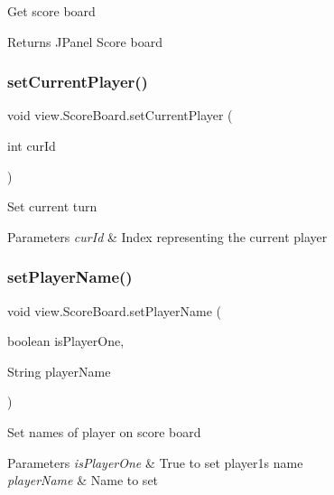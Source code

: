 Get score board \begin{DoxyReturn}{Returns}
J\+Panel Score board 
\end{DoxyReturn}
\mbox{\label{classview_1_1_score_board_a2e37f0bda468fefb721e2619c736546f}} 
\subsubsection{\texorpdfstring{setCurrentPlayer()}{setCurrentPlayer()}}
{\footnotesize\ttfamily void view.\+Score\+Board.\+set\+Current\+Player (\begin{DoxyParamCaption}\item[{int}]{cur\+Id }\end{DoxyParamCaption})\hspace{0.3cm}{\ttfamily [inline]}}

Set current turn 
\begin{DoxyParams}{Parameters}
{\em cur\+Id} & Index representing the current player \\
\hline
\end{DoxyParams}
\mbox{\label{classview_1_1_score_board_a2868eabf0df3041317516ddf762c05f4}} 
\subsubsection{\texorpdfstring{setPlayerName()}{setPlayerName()}}
{\footnotesize\ttfamily void view.\+Score\+Board.\+set\+Player\+Name (\begin{DoxyParamCaption}\item[{boolean}]{is\+Player\+One,  }\item[{String}]{player\+Name }\end{DoxyParamCaption})\hspace{0.3cm}{\ttfamily [inline]}}

Set names of player on score board 
\begin{DoxyParams}{Parameters}
{\em is\+Player\+One} & True to set player1\textquotesingle{}s name \\
\hline
{\em player\+Name} & Name to set \\
\hline
\end{DoxyParams}
\mbox{\label{classview_1_1_score_board_ab2ce69c0f2a069520648b51dacb00949}} 
